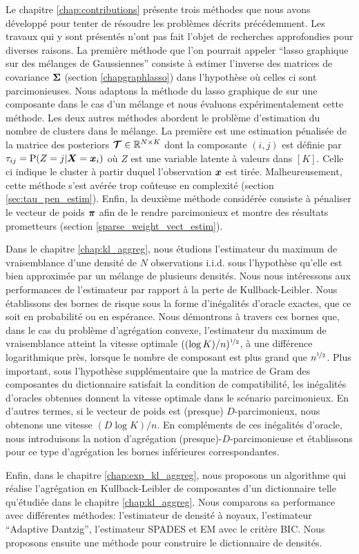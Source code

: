 Le chapitre \ref{chap:contributions} présente trois méthodes que nous avons développé pour tenter de résoudre les problèmes décrits précédemment. Les travaux qui y sont présentés n'ont pas fait l'objet de recherches approfondies pour diverses raisons. La première méthode que l'on pourrait appeler ``lasso graphique sur des mélanges de Gaussiennes'' consiste à estimer l'inverse des matrices de covariance $\boldsymbol\Sigma$ (section \ref{chapgraphlasso}) dans l'hypothèse où celles ci sont parcimonieuses. Nous adaptons la méthode du lasso graphique de \citep{glasso07} sur une composante dans le cas d'un mélange et nous évaluons expérimentalement cette méthode. Les deux autres méthodes abordent le problème d'estimation du nombre de clusters dans le mélange. La première est une estimation pénalisée de la matrice des posteriors $\boldsymbol{\mathcal T}\in{\mathbb R}^{N\times K}$ dont la composante $(i,j)$ est définie par $\tau_{ij}=\textnormal{P}(Z=j|\boldsymbol X=\boldsymbol x_i)$ où $Z$ est une variable latente à valeurs dans $[K]$. Celle ci indique le cluster à partir duquel l'observation $\boldsymbol x$ est tirée. Malheureusement, cette méthode s'est avérée trop coûteuse en complexité (section \ref{sec:tau_pen_estim}). Enfin, la deuxième méthode considérée consiste à pénaliser le vecteur de poids $\boldsymbol \pi$ afin de le rendre parcimonieux et montre des résultats prometteurs (section \ref{sparse_weight_vect_estim}).

Dans le chapitre \ref{chap:kl_aggreg}, nous étudions l'estimateur du maximum de vraisemblance d'une densité de $N$ observations i.i.d. sous l’hypothèse qu'elle est bien approximée par un mélange de plusieurs densités. Nous nous intéressons aux performances de l'estimateur par rapport à la perte de Kullback-Leibler. Nous établissons des bornes de risque sous la forme d'inégalités d'oracle exactes, que ce soit en probabilité ou en espérance. Nous démontrons à travers ces bornes que, dans le cas du problème d’agrégation convexe, l'estimateur du maximum de vraisemblance atteint la vitesse optimale $((\log K)/n)^{\nicefrac12}$, à une différence logarithmique près, lorsque le nombre de composant est plus grand que $n^{\nicefrac12}$. Plus important, sous l’hypothèse supplémentaire que la matrice de Gram des composantes du dictionnaire satisfait la condition de compatibilité, les inégalités d'oracles obtenues donnent la vitesse optimale dans le scénario parcimonieux. En d'autres termes, si le vecteur de poids est (presque) $D$-parcimonieux, nous obtenons une vitesse $(D\log K)/n$. En compléments de ces inégalités d'oracle, nous introduisons la notion d’agrégation (presque)-$D$-parcimonieuse et établissons pour ce type d’agrégation les bornes inférieures correspondantes.

Enfin, dans le chapitre \ref{chap:exp_kl_aggreg}, nous proposons un algorithme qui réalise l'agrégation en Kullback-Leibler de composantes d'un dictionnaire telle qu'étudiée dans le chapitre \ref{chap:kl_aggreg}. Nous comparons sa performance avec différentes méthodes: l'estimateur de densité à noyaux, l'estimateur ``Adaptive Dantzig'', l'estimateur SPADES et EM avec le critère BIC. Nous proposons ensuite une méthode pour construire le dictionnaire de densités.
